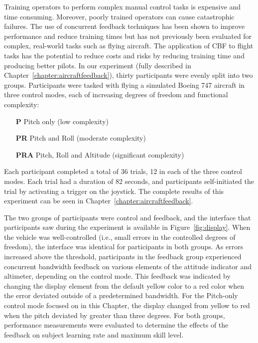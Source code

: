 Training operators to perform complex manual control tasks is expensive and time consuming.
Moreover, poorly trained operators can cause catastrophic failures.
The use of concurrent feedback techniques has been shown to improve performance and reduce training times but has not previously been evaluated for complex, real-world tasks such as flying aircraft.
The application of CBF to flight tasks has the potential to reduce costs and risks by reducing training time and producing better pilots.
In our experiment (fully described in Chapter~\ref{chapter:aircraftfeedback}), thirty participants were evenly split into two groups.
Participants were tasked with flying a simulated Boeing 747 aircraft in three control modes, each of increasing degrees of freedom and functional complexity:
\begin{itemize}
    \item[\textbf{P}] Pitch only (low complexity)
    \item[\textbf{PR}] Pitch and Roll (moderate complexity)
    \item[\textbf{PRA}] Pitch, Roll and Altitude (significant complexity)
\end{itemize}

Each participant completed a total of 36 trials, 12 in each of the three control modes.
Each trial had a duration of 82 seconds, and participants self-initiated the trial by activating a trigger on the joystick.
The complete results of this experiment can be seen in Chapter~\ref{chapter:aircraftfeedback}.

The two groups of participants were control and feedback, and the interface that participants saw during the experiment is available in Figure~\ref{fig:display}.
When the vehicle was well-controlled (i.e., small errors in the controlled degrees of freedom), the interface was identical for participants in both groups.
As errors increased above the threshold, participants in the feedback group experienced concurrent bandwidth feedback on various elements of the attitude indicator and altimeter, depending on the control mode.
This feedback was indicated by changing the display element from the default yellow color to a red color when the error deviated outside of a predetermined bandwidth.
For the Pitch-only control mode focused on in this Chapter, the display changed from yellow to red when the pitch deviated by greater than three degrees.
For both groups, performance measurements were evaluated to determine the effects of the feedback on subject learning rate and maximum skill level.

